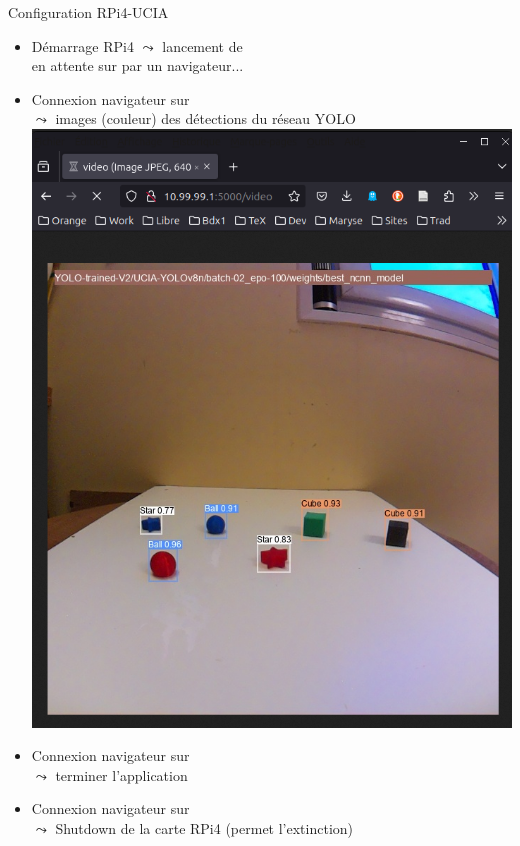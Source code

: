 \documentclass[11pt,serif,mathserif,compress,hyperref={colorlinks}]{beamer}
\begin{document}
\begin{frame}{Configuration RPi4-UCIA}
  
  \begin{tcolorbox}[title=Exploitation des réseaux YOLO : Navigateur web, add to width=.7cm, height=68mm]
    {\small
      \begin{itemize}
      \item<1-> Démarrage RPi4 $\leadsto$ lancement de \\
        en attente sur  par un navigateur... 
      \item<2-> Connexion navigateur sur \\
        $\leadsto$ images (couleur) des détections du réseau YOLO\\
         {\vspace*{-3cm}\includegraphics[width=.65\textwidth]{images/detect_camera-3_b.png}}
      \item<4-> Connexion navigateur sur \\
        $\leadsto$ terminer l'application
      \item<4-> Connexion navigateur sur \\
        $\leadsto$ Shutdown de la carte RPi4 (permet l'extinction)
      \end{itemize}
    }
    
  \end{tcolorbox}
    
\end{frame}
\end{document}
